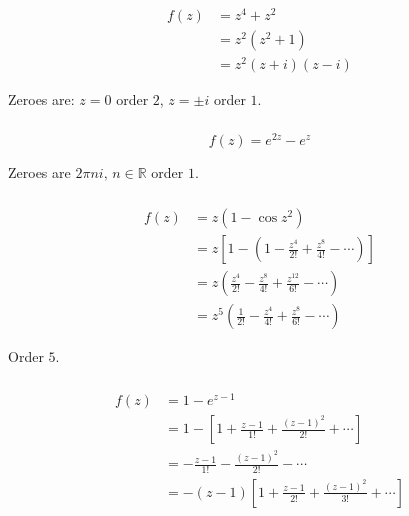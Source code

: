 \documentclass{article}
\begin{document}
\begin{align*}
  f(z) & = z^4 + z^2           \\
       & = z^2 (z^2 + 1)       \\
       & = z^2 (z + i) (z - i)
\end{align*}

Zeroes are: $z = 0$ order $2$, $z = \pm i$ order $1$.

\setcounter{subsubsection}{6}
\subsubsection{}

\[f(z) = e^{2 z} - e^z\]

Zeroes are $2 \pi n i,\, n \in \mathbb{R}$ order $1$.

\setcounter{subsubsection}{8}
\subsubsection{}

\begin{align*}
  f(z) & = z (1 - \cos z^2)                                                                 \\
       & = z \left[ 1 - \left( 1 - \frac{z^4}{2!} + \frac{z^8}{4!} - \cdots \right) \right] \\
       & = z \left( \frac{z^4}{2!} - \frac{z^8}{4!} + \frac{z^{12}}{6!} - \cdots \right)    \\
       & = z^5 \left( \frac{1}{2!} - \frac{z^4}{4!} + \frac{z^8}{6!} - \cdots \right)
\end{align*}

Order $5$.

\setcounter{subsubsection}{10}
\subsubsection{}

\begin{align*}
  f(z) & = 1 - e^{z - 1}                                                                \\
       & = 1 - \left[ 1 + \frac{z - 1}{1!} + \frac{(z - 1)^2}{2!} + \cdots \right]      \\
       & = -\frac{z - 1}{1!} - \frac{(z - 1)^2}{2!} - \cdots                            \\
       & = -(z - 1) \left[ 1 + \frac{z - 1}{2!} + \frac{(z - 1)^2}{3!} + \cdots \right]
\end{align*}
\end{document}
